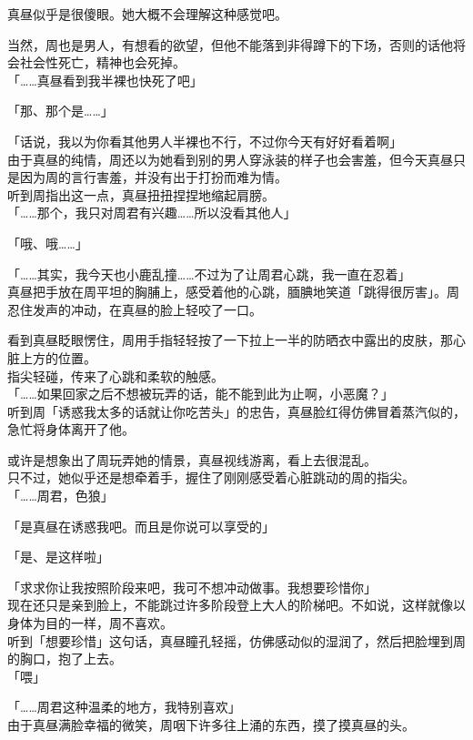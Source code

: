 真昼似乎是很傻眼。她大概不会理解这种感觉吧。

当然，周也是男人，有想看的欲望，但他不能落到非得蹲下的下场，否则的话他将会社会性死亡，精神也会死掉。\\

「……真昼看到我半裸也快死了吧」

「那、那个是……」

「话说，我以为你看其他男人半裸也不行，不过你今天有好好看着啊」\\

由于真昼的纯情，周还以为她看到别的男人穿泳装的样子也会害羞，但今天真昼只是因为周的言行害羞，并没有出于打扮而难为情。\\

听到周指出这一点，真昼扭扭捏捏地缩起肩膀。\\

「……那个，我只对周君有兴趣……所以没看其他人」

「哦、哦……」

「……其实，我今天也小鹿乱撞……不过为了让周君心跳，我一直在忍着」\\

真昼把手放在周平坦的胸脯上，感受着他的心跳，腼腆地笑道「跳得很厉害」。周忍住发声的冲动，在真昼的脸上轻咬了一口。

看到真昼眨眼愣住，周用手指轻轻按了一下拉上一半的防晒衣中露出的皮肤，那心脏上方的位置。\\

指尖轻碰，传来了心跳和柔软的触感。\\

「……如果回家之后不想被玩弄的话，能不能到此为止啊，小恶魔？」\\

听到周「诱惑我太多的话就让你吃苦头」的忠告，真昼脸红得仿佛冒着蒸汽似的，急忙将身体离开了他。

或许是想象出了周玩弄她的情景，真昼视线游离，看上去很混乱。\\

只不过，她似乎还是想牵着手，握住了刚刚感受着心脏跳动的周的指尖。\\

「……周君，色狼」

「是真昼在诱惑我吧。而且是你说可以享受的」

「是、是这样啦」

「求求你让我按照阶段来吧，我可不想冲动做事。我想要珍惜你」\\

现在还只是亲到脸上，不能跳过许多阶段登上大人的阶梯吧。不如说，这样就像以身体为目的一样，周不喜欢。\\

听到「想要珍惜」这句话，真昼瞳孔轻摇，仿佛感动似的湿润了，然后把脸埋到周的胸口，抱了上去。\\

「喂」

「……周君这种温柔的地方，我特别喜欢」\\

由于真昼满脸幸福的微笑，周咽下许多往上涌的东西，摸了摸真昼的头。
